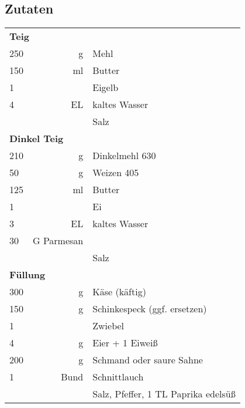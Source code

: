 \subsection*{Zutaten}
\begin{tabular}{lrl}
    \multicolumn{3}{l}{\textbf{Teig}}                      \\
    250 &          g & Mehl                                \\
    150 &         ml & Butter                              \\
    1   &            & Eigelb                              \\
    4   &         EL & kaltes Wasser                       \\
    &            & Salz                                \\
    \multicolumn{3}{l}{\textbf{Dinkel Teig}}               \\
    210 &          g & Dinkelmehl 630                      \\
    50  &          g & Weizen 405                          \\
    125 &         ml & Butter                              \\
    1   &            & Ei                                  \\
    3   &         EL & kaltes Wasser                       \\
    30  & G Parmesan &                                     \\
    &            & Salz                                \\
    \multicolumn{3}{l}{\textbf{Füllung}}                   \\
    300 &          g & Käse (käftig)                       \\
    150 &          g & Schinkespeck (ggf. ersetzen)        \\
    1   &            & Zwiebel                             \\
    4   &          g & Eier + 1 Eiweiß                     \\
    200 &          g & Schmand oder saure Sahne            \\
    1   &       Bund & Schnittlauch                        \\
    &            & Salz, Pfeffer, 1 TL Paprika edelsüß
\end{tabular} 
